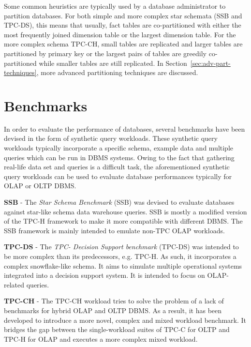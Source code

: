 Some common heuristics are typically used by a database administrator \cite{zamanian2015locality} to partition databases. For both simple and more complex star schemata (SSB and TPC-DS), this means that usually, fact tables are co-partitioned with either the most frequently joined dimension table or the largest dimension table. For the more complex schema TPC-CH, small tables are replicated and larger tables are partitioned by primary key or the largest pairs of tables are greedily co-partitioned while smaller tables are still replicated. In Section~\ref{sec:adv-part-techniques}, more advanced partitioning techniques are discussed.

\section{Benchmarks}
\label{benchmarks}
In order to evaluate the performance of databases, several benchmarks have been devised in the form of synthetic query workloads. These synthetic query workloads typically incorporate a specific schema, example data and multiple queries which can be run in DBMS systems. Owing to the fact that gathering real-life data set and queries is a difficult task, the aforementioned synthetic query workloads can be used to evaluate database performances typically for OLAP or OLTP DBMS.

\textbf{SSB} \cite{o2007star} - The \textit{Star Schema Benchmark} (SSB) was devised to evaluate databases against star-like schema data warehouse queries. SSB is mostly a modified version of the TPC-H framework to make it more compatible with different DBMS. The SSB framework is mainly intended to emulate non-TPC OLAP workloads. 

\textbf{TPC-DS} \cite{Nambiar:2006:MT:1182635.1164217} - The \textit{TPC- Decision Support benchmark} (TPC-DS) was intended to be more complex than its predecessors, e.g. TPC-H. As such, it incorporates a complex snowflake-like schema. It aims to simulate multiple operational systems integrated into a decision support system. It is intended to focus on OLAP-related queries.

\textbf{TPC-CH} \cite{Cole:2011:MWC:1988842.1988850} - The TPC-CH workload tries to solve the problem of a lack of benchmarks for hybrid OLAP and OLTP DBMS. As a result, it has been developed to introduce a more novel, complex and mixed workload benchmark. It bridges the gap between the single-workload suites of TPC-C for OLTP and TPC-H for OLAP and executes a more complex mixed workload.

